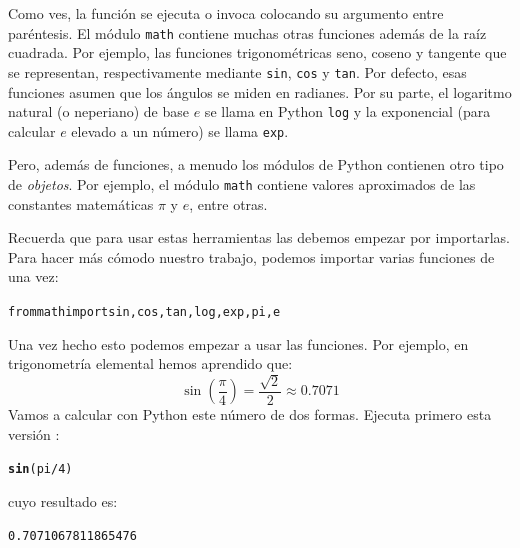 \documentclass[10pt,a4paper]{article}\usepackage[]{graphicx}\usepackage[]{color}
\makeatletter
\newcommand{\hlnum}[1]{\textcolor[rgb]{0.686,0.059,0.569}{#1}}%
\newcommand{\hlopt}[1]{\textcolor[rgb]{0,0,0}{#1}}%
\newcommand{\hlstd}[1]{\textcolor[rgb]{0.345,0.345,0.345}{#1}}%
\newcommand{\hlkwd}[1]{\textcolor[rgb]{0.737,0.353,0.396}{\textbf{#1}}}%
\newenvironment{kframe}{%
 \def\at@end@of@kframe{}%
 \ifinner\ifhmode%
  \def\at@end@of@kframe{\end{minipage}}%
  \begin{minipage}{\columnwidth}%
 \fi\fi%
 \def\FrameCommand##1{\hskip\@totalleftmargin \hskip-\fboxsep
 \colorbox{shadecolor}{##1}\hskip-\fboxsep
     \hskip-\linewidth \hskip-\@totalleftmargin \hskip\columnwidth}%
 \MakeFramed {\advance\hsize-\width
   \@totalleftmargin\z@ \linewidth\hsize
   \@setminipage}}%
 {\par\unskip\endMakeFramed%
 \at@end@of@kframe}
\newenvironment{knitrout}{}{} %
\newcounter {cont01}
\makeatother
\begin{document}
Como ves, la función se ejecuta o {\sf invoca} colocando su argumento entre paréntesis. El módulo {\tt math} contiene muchas otras funciones además de la raíz cuadrada. Por ejemplo, las funciones trigonométricas seno, coseno y tangente que se representan, respectivamente mediante  {\tt sin}, {\tt cos} y {\tt tan}. Por defecto, esas funciones asumen que los ángulos se miden en radianes. Por su parte, el logaritmo natural (o neperiano) de base $e$ se llama en Python {\tt log} y la exponencial (para calcular $e$ elevado a un número) se llama  {\tt exp}.

Pero, además de funciones, a menudo los módulos de Python contienen otro tipo de {\em objetos}. Por ejemplo, el módulo {\tt math} contiene valores aproximados de las constantes matemáticas $\pi$ y $e$, entre otras.

Recuerda que para usar estas herramientas las debemos empezar por importarlas. Para hacer más cómodo nuestro trabajo, podemos importar varias funciones de una vez:
\begin{knitrout}
\color{fgcolor}\begin{kframe}
\begin{alltt}
from math import sin, cos, tan, log, exp, pi, e
\end{alltt}
\end{kframe}
\end{knitrout}
Una vez hecho esto podemos empezar a usar las funciones. Por ejemplo, en trigonometría elemental hemos aprendido que:
$$\sin\left(\dfrac{\pi}{4}\right) = \dfrac{\sqrt{2}}{2}\approx 0.7071$$
Vamos a calcular con Python este número de dos formas. Ejecuta primero esta versión :
\begin{knitrout}
\color{fgcolor}\begin{kframe}
\begin{alltt}
\hlkwd{sin}\hlstd{(pi}\hlopt{/}\hlnum{4}\hlstd{)}
\end{alltt}
\end{kframe}
\end{knitrout}
cuyo resultado es:
\begin{knitrout}
\color{fgcolor}\begin{kframe}
\begin{verbatim}
0.7071067811865476
\end{verbatim}
\end{kframe}
\end{knitrout}
\end{document}

